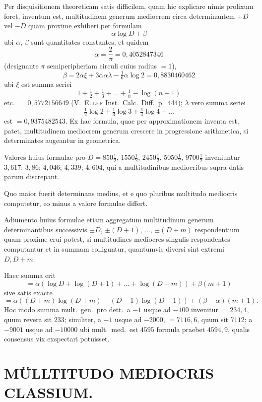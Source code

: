 \documentclass[12pt,a4paper]{article}
\theoremstyle{plain}
\theoremstyle{definition}
\theoremstyle{remark}
\begin{document}
Per disquisitionem theoreticam satis difficilem, quam hic explicare nimis
prolixum foret, inventum est, multitudinem generum mediocrem circa
determinantem $+D$ vel $-D$ quam proxime exhiberi per formulam
\[
\alpha \log D + \beta
\]
ubi $\alpha$, $\beta$ sunt quantitates constantes, et quidem
\[
\alpha = \frac{2}{\pi} = 0{,}4052847346
\]
(designante $\pi$ semiperipheriam circuli cuius radius $= 1$),
\[
\beta = 2\alpha\xi + 3\alpha\alpha\lambda - \tfrac{1}{6}\alpha\log 2 = 0{,}8830460462
\]
ubi $\xi$ est summa seriei
\[
1 + \tfrac{1}{2} + \tfrac{1}{3} + \ldots + \tfrac{1}{n} - \log(n+1)
\]
etc.\ $= 0{,}5772156649$ (V.\ \textsc{Euler} Inst.\ Calc.\ Diff.\ p.\@~444); $\lambda$ vero
summa seriei
\[
\tfrac{1}{2}\log 2 + \tfrac{1}{3}\log 3 + \tfrac{1}{4}\log 4 + \ldots
\]
est $= 0{,}9375482543$. Ex hac formula, quae per approximationem inventa est,
patet, multitudinem mediocrem generum crescere in progressione arithmetica, si
determinates augeantur in geometrica.

Valores huius formulae pro $D = 850\tfrac{1}{2}$, $1550\tfrac{1}{2}$, $2450\tfrac{1}{2}$,
$5050\tfrac{1}{2}$, $9700\tfrac{1}{2}$ inveniuntur $3{,}617$; $3{,}86$; $4{,}046$; $4{,}339$;
$4{,}604$, qui a multitudinibus mediocribus supra datis parum discrepant.

Quo maior fuerit determinans medius, et e quo pluribus multitudo mediocris
computetur, eo minus a valore formulae differt.

Adiumento huius formulae etiam aggregatum multitudinum generum
determinantibus successivis $\pm D$, $\pm(D+1)$, $\ldots$, $\pm(D+m)$ respondentium
quam proxime erui potest, si multitudines mediocres singulis respondentes
computantur et in summam colliguntur, quantumvis diversi sint extremi
$D, D+m$.

Haec summa erit
\[
= \alpha(\log D + \log(D+1) + \ldots + \log(D+m)) + \beta(m+1)
\]
sive satis exacte
\[
= \alpha((D+m)\log(D+m) - (D-1)\log(D-1)) + (\beta - \alpha)(m+1).
\]
Hoc modo summa mult.\ gen.\ pro dett.\ a $-1$ usque ad $-100$ invenitur
$= 234{,}4$, quum revera sit $233$; similiter, a $-1$ usque ad $-2000$,
$= 7116{,}6$, quum sit $7112$; a $-9001$ usque ad $-10000$ ubi mult.\ med.\ est
$4595$ formula praebet $4594{,}9$, qualis consensus vix exspectari potuisset.

\newpage
{}
\section*{MÜLLTITUDO MEDIOCRIS CLASSIUM.}
\end{document}
